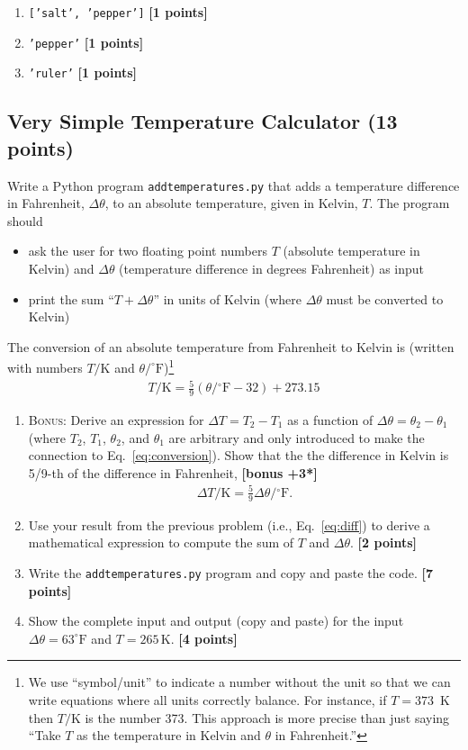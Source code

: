 \documentclass[letterpaper]{scrartcl}
\newcommand{\BONUS}{\textsc{Bonus: }}
\newcommand{\bonus}[1]{\textbf{[bonus +#1*]}}
\newcommand{\points}[1]{\textbf{[#1 points]}}
\newenvironment{enuma}{\begin{enumerate}[label=(\alph*)]}{\end{enumerate}}
\newenvironment{enumi}{\begin{enumerate}[label=(\roman*)]}{\end{enumerate}}
\newcommand{\python}[1]{\texttt{#1}}
\begin{document}
\begin{enuma}
  \begin{enumi}
  \item \python{['salt', 'pepper']} \points{1}
  \item \python{'pepper'} \points{1}
  \item \python{'ruler'} \points{1}
  \end{enumi}
\end{enuma}

\subsection{Very Simple Temperature Calculator (13 points)}
\label{sec:calculator}

Write a Python program \texttt{addtemperatures.py} that adds a
temperature difference in Fahrenheit, $\Delta\theta$, to an absolute
temperature, given in Kelvin, $T$. The program should
\begin{itemize}
\item ask the user for two floating point numbers $T$ (absolute
  temperature in Kelvin) and $\Delta\theta$ (temperature difference in
  degrees Fahrenheit) as input
\item print the sum ``$T + \Delta\theta$'' in units of Kelvin (where
  $\Delta\theta$ must be converted to Kelvin)
\end{itemize}
The conversion of an absolute temperature from Fahrenheit to Kelvin is
(written with numbers $T/\text{K}$ and
$\theta/^{\circ}\text{F}$)\footnote{We use ``symbol/unit'' to indicate
a number without the unit so that we can write equations where all
units correctly balance. For instance, if $T=373$~K then $T/\text{K}$
is the number 373. This approach is more precise than just saying
``Take $T$ as the temperature in Kelvin and $\theta$ in Fahrenheit.''}
\begin{gather}
  \label{eq:conversion}
  T/\text{K} = \frac{5}{9}(\theta/\text{$^{\circ}$F} - 32) + 273.15
\end{gather}

\begin{enuma}
\item \BONUS Derive an expression for $\Delta T = T_{2} - T_{1}$ as a
  function of $\Delta \theta = \theta_{2} - \theta_{1}$ (where
  $T_{2}$, $T_{1}$, $\theta_{2}$, and $\theta_{1}$ are arbitrary and
  only introduced to make the connection to
  Eq.~\ref{eq:conversion}). Show that the the difference in Kelvin is
  5/9-th of the difference in Fahrenheit, \bonus{3}
  \begin{gather}
    \label{eq:diff}
    \Delta T/\text{K} = \frac{5}{9} \Delta \theta/\text{$^{\circ}$F}.
  \end{gather}
\item Use your result from the previous problem (i.e.,
  Eq.~\ref{eq:diff}) to derive a mathematical expression to compute
  the sum of $T$ and $\Delta\theta$. \points{2}  
\item Write the \texttt{addtemperatures.py} program and copy and paste
  the code. \points{7}
\item Show the complete input and output (copy and paste) for the
  input $\Delta\theta = 63^{\circ}\text{F}$ and $T =
  265\,\text{K}$. \points{4}
\end{enuma}
\end{document}
